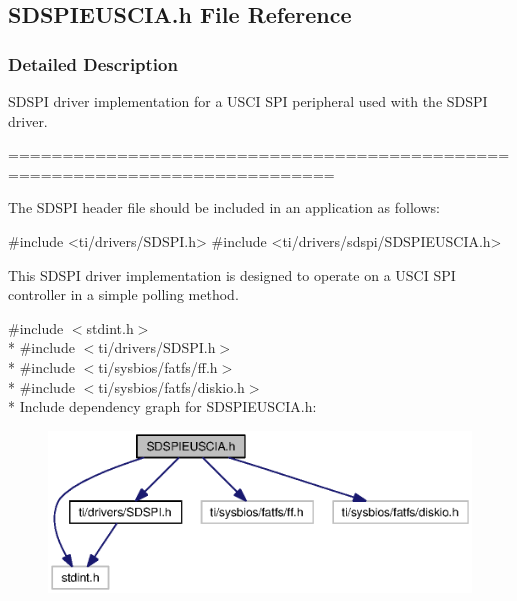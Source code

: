 \subsection{S\+D\+S\+P\+I\+E\+U\+S\+C\+I\+A.\+h File Reference}
\label{_s_d_s_p_i_e_u_s_c_i_a_8h}


\subsubsection{Detailed Description}
S\+D\+S\+P\+I driver implementation for a U\+S\+C\+I S\+P\+I peripheral used with the S\+D\+S\+P\+I driver. 

============================================================================

The S\+D\+S\+P\+I header file should be included in an application as follows\+: 
\begin{DoxyCode}
\textcolor{preprocessor}{#include <ti/drivers/SDSPI.h>}
\textcolor{preprocessor}{#include <ti/drivers/sdspi/SDSPIEUSCIA.h>}
\end{DoxyCode}


This S\+D\+S\+P\+I driver implementation is designed to operate on a U\+S\+C\+I S\+P\+I controller in a simple polling method. 

{\ttfamily \#include $<$stdint.\+h$>$}\\*
{\ttfamily \#include $<$ti/drivers/\+S\+D\+S\+P\+I.\+h$>$}\\*
{\ttfamily \#include $<$ti/sysbios/fatfs/ff.\+h$>$}\\*
{\ttfamily \#include $<$ti/sysbios/fatfs/diskio.\+h$>$}\\*
Include dependency graph for S\+D\+S\+P\+I\+E\+U\+S\+C\+I\+A.\+h\+:
\nopagebreak
\begin{figure}[H]
\begin{center}
\leavevmode
\includegraphics[width=350pt]{_s_d_s_p_i_e_u_s_c_i_a_8h__incl}
\end{center}
\end{figure}
